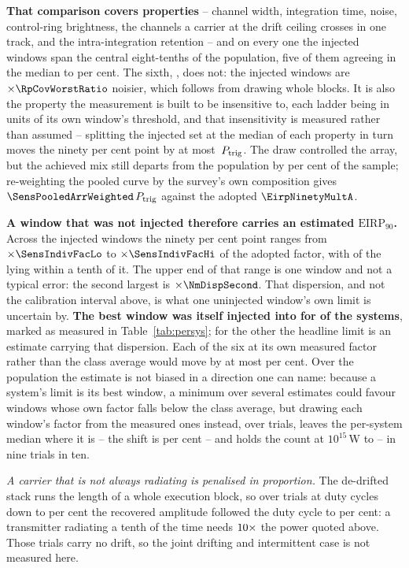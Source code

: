 \textbf{That comparison covers \RpNAxis{} properties} -- channel width,
integration time, noise, control-ring brightness, the channels a carrier at
the drift ceiling crosses in one track, and the intra-integration retention
-- and on every one the injected windows span the central eight-tenths of the
population, five of them agreeing in the median to \RpCovOtherPct{} per cent.
The sixth, \RpCovWorstAxis, does not: the injected windows are
$\times\RpCovWorstRatio$ noisier, which follows from drawing whole blocks. It
is also the property the measurement is built to be insensitive to, each
ladder being in units of its own window's threshold, and that insensitivity
is measured rather than assumed -- splitting the injected set at the median
of each property in turn moves the ninety per cent point by at most
\RpFacShiftMax\,$P_{\rm trig}$. The draw controlled the array, but the
achieved mix still departs from the population by \SensCovWorstPct{} per cent
of the sample; re-weighting the pooled curve by the survey's own composition
gives $\SensPooledArrWeighted\,P_{\rm trig}$ against the adopted
$\EirpNinetyMultA$.

\textbf{A window that was not injected therefore carries an estimated
$\mathrm{EIRP}_{90}$.} Across the injected windows the ninety per cent point
ranges from $\times\SensIndivFacLo$ to $\times\SensIndivFacHi$ of the
adopted factor, with \NmDispNTenth{} of the \SensNInj{} lying within a tenth
of it. The upper end of that range is one window and not a typical error: the
second largest is $\times\NmDispSecond$. That dispersion, and not the calibration
interval above, is what one uninjected window's own limit is uncertain by.
\textbf{The best window was itself injected into for \SmcNMeasSys{} of the
\NSysClassA{} systems}, marked as measured in Table~\ref{tab:persys}; for the
other \SmcNEstSys{} the headline limit is an estimate carrying that
dispersion. Each of the six at its own measured
factor rather than the class average would move by at most \NmOwnDevPct{} per
cent. Over the population the estimate is not biased in a direction one can
name: because a system's limit is its best window, a minimum over several
estimates could favour windows whose own factor falls below the class
average, but drawing each window's factor from the \SensNInj{} measured ones
instead, over \ScRsNTrial{} trials, leaves the per-system median where it
is -- the shift is \ScRsMedShiftPct{} per cent -- and holds the count at
$10^{15}$\,W to \ScRsNLo--\ScRsNHi{} in nine trials in ten.

\emph{A carrier that is not always radiating is penalised in proportion.} The
de-drifted stack runs the length of a whole execution block, so over
\DutyNTrial{} trials at duty cycles down to \DutyCycleMinPct{} per cent the
recovered amplitude followed the duty cycle to \DutyAttenDevPct{} per cent: a
transmitter radiating a tenth of the time needs $10\times$ the power
quoted above. Those trials carry no drift, so the joint drifting and
intermittent case is not measured here.

